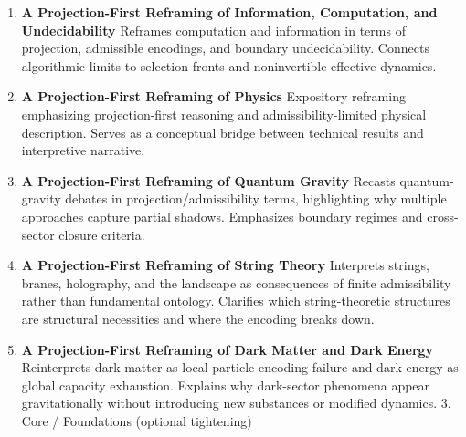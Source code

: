 \documentclass[11pt]{article}
\begin{document}
\begin{enumerate}[leftmargin=*]




\item \textbf{A Projection-First Reframing of Information, Computation, and Undecidability} Reframes computation and information in terms of projection, admissible encodings, and boundary undecidability. Connects algorithmic limits to selection fronts and noninvertible effective dynamics.
\item \textbf{A Projection-First Reframing of Physics} Expository reframing emphasizing projection-first reasoning and admissibility-limited physical description. Serves as a conceptual bridge between technical results and interpretive narrative.
\item \textbf{A Projection-First Reframing of Quantum Gravity} Recasts quantum-gravity debates in projection/admissibility terms, highlighting why multiple approaches capture partial shadows. Emphasizes boundary regimes and cross-sector closure criteria.
\item \textbf{A Projection-First Reframing of String Theory}
Interprets strings, branes, holography, and the landscape as consequences of finite admissibility rather than fundamental ontology. Clarifies which string-theoretic structures are structural necessities and where the encoding breaks down.
\item \textbf{A Projection-First Reframing of Dark Matter and Dark Energy}
Reinterprets dark matter as local particle-encoding failure and dark energy as global capacity exhaustion. Explains why dark-sector phenomena appear gravitationally without introducing new substances or modified dynamics.
3. Core / Foundations (optional tightening)
\end{enumerate}
\end{document}
